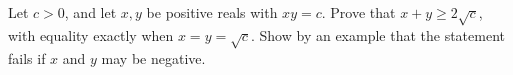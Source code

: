 Let $c>0$, and let $x,y$ be positive reals with $xy=c$. Prove that $x+y\ge2\sqrt c$, with equality exactly when $x=y=\sqrt c$. Show by an example that the statement fails if $x$ and $y$ may be negative.
